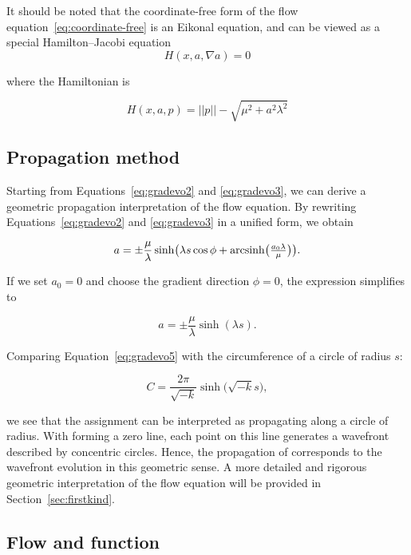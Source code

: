 It should be noted that the coordinate-free form of the flow equation~\eqref{eq:coordinate-free} is an Eikonal equation,
and can be viewed as a special Hamilton–Jacobi equation
\[
H(x, a, \nabla a) = 0
\]

where the Hamiltonian is

\begin{equation}\label{eq:hamiltonian}
    H(x, a, p) = ||p|| - \sqrt{\mu^2 + a^2 \lambda^2}
\end{equation}

\subsection{Propagation method}\label{subsec:propagation-method}

Starting from Equations~\eqref{eq:gradevo2} and \eqref{eq:gradevo3}, we can derive a geometric propagation interpretation of the flow equation.
By rewriting Equations~\eqref{eq:gradevo2} and \eqref{eq:gradevo3} in a unified form, we obtain

\begin{equation}
a = \pm \frac{\mu}{\lambda} \sinh\bigl(\lambda s \cos \phi + \operatorname{arcsinh}\bigl(\tfrac{a_0 \lambda}{\mu}\bigr)\bigr).\label{eq:gradevo4}
\end{equation}

If we set $a_0=0$ and choose the gradient direction $\phi=0$, the expression simplifies to

\begin{equation}
a = \pm \frac{\mu}{\lambda} \sinh(\lambda s).\label{eq:gradevo5}
\end{equation}

Comparing Equation~\eqref{eq:gradevo5} with the circumference of a circle of radius $s$:

\begin{equation}
C =  \frac{2\pi}{\sqrt{-k}} \sinh\bigl(\sqrt{-k} s\bigr), \label{eq:circle}
\end{equation}

we see that the assignment  can be interpreted as propagating along a circle of radius.
With  forming a zero line, each point on this line generates a wavefront described by concentric circles.
Hence, the propagation of  corresponds to the wavefront evolution in this geometric sense.
A more detailed and rigorous geometric interpretation of the flow equation will be provided in Section~\ref{sec:firstkind}.

\subsection{Flow and function}\label{subsec:flow-and-function}

